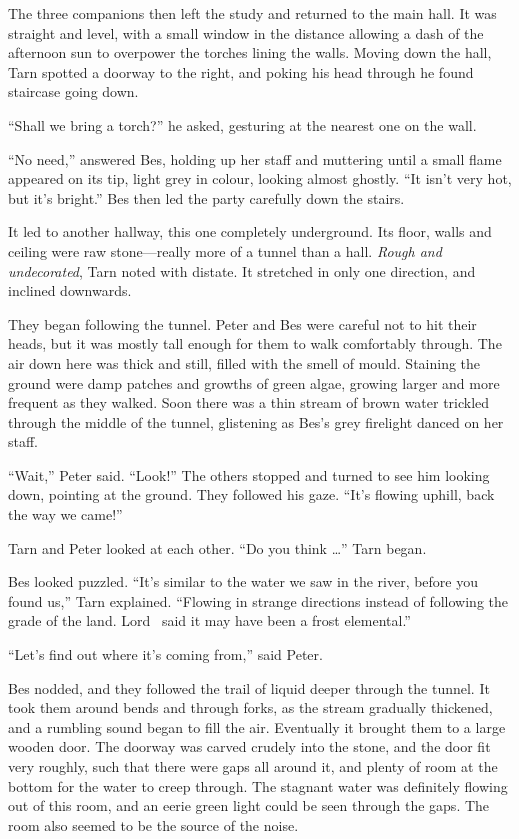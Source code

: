 The three companions then left the study and returned to the main hall.  It was straight and level, with a small window in the distance allowing a dash of the afternoon sun to overpower the torches lining the walls.  Moving down the hall, Tarn spotted a doorway to the right, and poking his head through he found staircase going down.

``Shall we bring a torch?'' he asked, gesturing at the nearest one on the wall.

``No need,'' answered Bes, holding up her staff and muttering until a small flame appeared on its tip, light grey in colour, looking almost ghostly.  ``It isn't very hot, but it's bright.'' Bes then led the party carefully down the stairs.

It led to another hallway, this one completely underground.  Its floor, walls and ceiling were raw stone---really more of a tunnel than a hall.  \emph{Rough and undecorated}, Tarn noted with distate.  It stretched in only one direction, and inclined downwards.

They began following the tunnel.  Peter and Bes were careful not to hit their heads, but it was mostly tall enough for them to walk comfortably through.  The air down here was thick and still, filled with the smell of mould.   Staining the ground were damp patches and growths of green algae, growing larger and more frequent as they walked.  Soon there was a thin stream of brown water trickled through the middle of the tunnel, glistening as Bes's grey firelight danced on her staff.

``Wait,'' Peter said.  ``Look!''  The others stopped and turned to see him looking down, pointing at the ground.  They followed his gaze.  ``It's flowing uphill, back the way we came!''

Tarn and Peter looked at each other.  ``Do you think \ldots'' Tarn began.

Bes looked puzzled.  ``It's similar to the water we saw in the river, before you found us,'' Tarn explained.  ``Flowing in strange directions instead of following the grade of the land.  Lord \arilor\ said it may have been a frost elemental.''

``Let's find out where it's coming from,'' said Peter.

Bes nodded, and they followed the trail of liquid deeper through the tunnel.  It took them around bends and through forks, as the stream gradually thickened, and a rumbling sound began to fill the air.  Eventually it brought them to a large wooden door.  The doorway was carved crudely into the stone, and the door fit very roughly, such that there were gaps all around it, and plenty of room at the bottom for the water to creep through.  The stagnant water was definitely flowing out of this room, and an eerie green light could be seen through the gaps.  The room also seemed to be the source of the noise.

